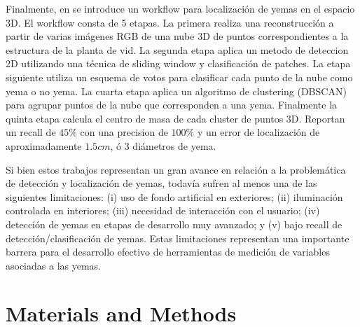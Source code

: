 \documentclass[a4paper,authoryear,review]{elsarticle}
\begin{document}
Finalmente, en \citet{diaz2018grapevine} se introduce un workflow para localización de yemas en el espacio 3D. El workflow consta de 5 etapas. La primera realiza una reconstrucción a partir de varias imágenes RGB de una nube 3D de puntos correspondientes a la estructura de la planta de vid. La segunda etapa aplica un metodo de deteccion 2D utilizando una técnica de sliding window y clasificación de patches. La etapa siguiente utiliza un esquema de votos para clasificar cada punto de la nube como yema o no yema. La cuarta etapa aplica un algoritmo de clustering (DBSCAN) para agrupar puntos de la nube que corresponden a una yema. Finalmente la quinta etapa calcula el centro de masa de cada cluster de puntos 3D.  Reportan un recall de $45\%$ con una precision de $100\%$ y un error de localización de aproximadamente $1.5cm$, ó 3 diámetros de yema. 

Si bien estos trabajos representan un gran avance en relación a la problemática de detección y localización de yemas, todavía sufren al menos una de las siguientes limitaciones: (i) uso de fondo artificial en exteriores; (ii) iluminación controlada en interiores; (iii) necesidad de interacción con el usuario; (iv) detección de yemas en etapas de desarrollo muy avanzado; y (v) bajo recall de detección/clasificación de yemas. Estas limitaciones representan una importante barrera para el desarrollo efectivo de herramientas de medición de variables asociadas a las yemas. 



\section{Materials and Methods}
\label{sec:matmet}
\end{document}
